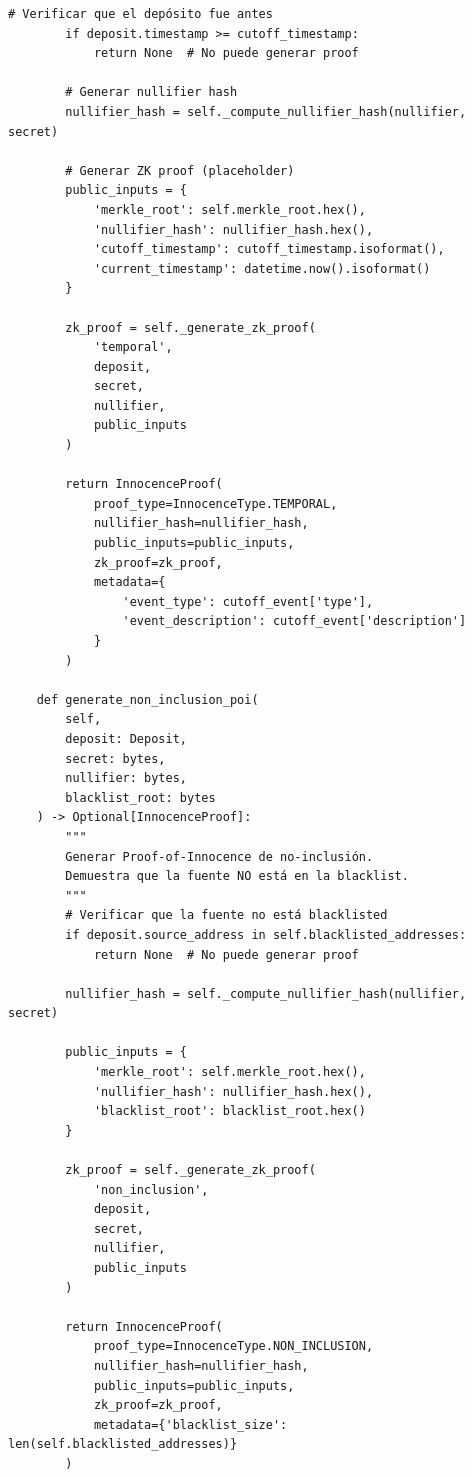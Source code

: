 \documentclass[11pt,a4paper,twoside]{book}
\theoremstyle{definition}
\theoremstyle{remark}
\begin{document}
\begin{lstlisting}[language=circom, caption={Circuito de Proof-of-Innocence temporal}]
        # Verificar que el depósito fue antes
        if deposit.timestamp >= cutoff_timestamp:
            return None  # No puede generar proof
        
        # Generar nullifier hash
        nullifier_hash = self._compute_nullifier_hash(nullifier, secret)
        
        # Generar ZK proof (placeholder)
        public_inputs = {
            'merkle_root': self.merkle_root.hex(),
            'nullifier_hash': nullifier_hash.hex(),
            'cutoff_timestamp': cutoff_timestamp.isoformat(),
            'current_timestamp': datetime.now().isoformat()
        }
        
        zk_proof = self._generate_zk_proof(
            'temporal',
            deposit,
            secret,
            nullifier,
            public_inputs
        )
        
        return InnocenceProof(
            proof_type=InnocenceType.TEMPORAL,
            nullifier_hash=nullifier_hash,
            public_inputs=public_inputs,
            zk_proof=zk_proof,
            metadata={
                'event_type': cutoff_event['type'],
                'event_description': cutoff_event['description']
            }
        )
    
    def generate_non_inclusion_poi(
        self,
        deposit: Deposit,
        secret: bytes,
        nullifier: bytes,
        blacklist_root: bytes
    ) -> Optional[InnocenceProof]:
        """
        Generar Proof-of-Innocence de no-inclusión.
        Demuestra que la fuente NO está en la blacklist.
        """
        # Verificar que la fuente no está blacklisted
        if deposit.source_address in self.blacklisted_addresses:
            return None  # No puede generar proof
        
        nullifier_hash = self._compute_nullifier_hash(nullifier, secret)
        
        public_inputs = {
            'merkle_root': self.merkle_root.hex(),
            'nullifier_hash': nullifier_hash.hex(),
            'blacklist_root': blacklist_root.hex()
        }
        
        zk_proof = self._generate_zk_proof(
            'non_inclusion',
            deposit,
            secret,
            nullifier,
            public_inputs
        )
        
        return InnocenceProof(
            proof_type=InnocenceType.NON_INCLUSION,
            nullifier_hash=nullifier_hash,
            public_inputs=public_inputs,
            zk_proof=zk_proof,
            metadata={'blacklist_size': len(self.blacklisted_addresses)}
        )
    

\end{lstlisting}
\end{document}
